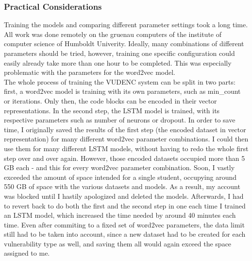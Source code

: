 \documentclass[
	a4paper,
	pagesize,
	pdftex,
	12pt,
	twoside, %
	BCOR=5mm, %
	ngerman,
	fleqn,
	final,
	]{scrartcl}
\begin{document}
\subsubsection{Practical Considerations}
Training the models and comparing different parameter settings took a long time. All work was done remotely on the gruenau computers of the institute of computer science of Humboldt Univerity. Ideally, many combinations of different parameters should be tried, however, training one specific configuration could easily already take more than one hour to be completed. This was especially problematic with the parameters for the word2vec model.\\
The whole process of training the VUDENC system can be split in two parts: first, a word2vec model is training with its own parameters, such as min\_count or iterations. Only then, the code blocks can be encoded in their vector representations. In the second step, the LSTM model is trained, with its respective parameters such as number of neurons or dropout. In order to save time, I originally saved the results of the first step (the encoded dataset in vector representation) for many different word2vec parameter combinations. I could then use them for many different LSTM models, without having to redo the whole first step over and over again. However, those encoded datasets occupied more than 5 GB each - and this for every word2vec parameter combination. Soon, I vastly exceeded the amount of space intended for a single student, occupying around 550 GB of space with the various datasets and models. As a result, my account was blocked until I hastily apologized and deleted the models. Afterwards, I had to revert back to do both the first and the second step in one each time I trained an LSTM model, which increased the time needed by around 40 minutes each time. Even after commiting to a fixed set of word2vec parameters, the data limit still had to be taken into account, since a new dataset had to be created for each vulnerability type as well, and saving them all would again exceed the space assigned to me. %
\end{document}
